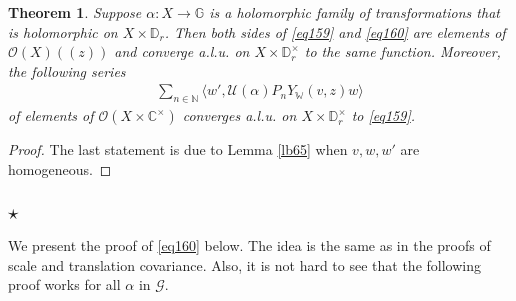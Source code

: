 \documentclass[11pt,b5paper,notitlepage]{article}
\theoremstyle{definition}
\theoremstyle{plain}
\newtheorem{thm}[df]{Theorem}
\newcommand{\mc}{\mathcal}
\newcommand{\bk}[1]{\langle {#1}\rangle}
\newcommand{\scr}{\mathscr}
\newcommand{\Wbb}{\mathbb W}
\newcommand{\Gbb}{\mathbb G}
\newcommand{\Cbb}{\mathbb C}
\newcommand{\Nbb}{\mathbb N}
\newcommand{\Dbb}{\mathbb D}
\numberwithin{equation}{section}
\begin{document}
\begin{thm}\label{lb95}
Suppose $\alpha:X\rightarrow\Gbb$ is a holomorphic family of transformations that is holomorphic on $X\times\Dbb_r$. Then both sides of \eqref{eq159} and \eqref{eq160} are elements of $\scr O(X)((z))$ and converge a.l.u. on $X\times\Dbb_r^\times$ to the same function. Moreover, the following series 
\begin{align}
\sum_{n\in\Nbb}\bk{w',\mc U(\alpha)P_nY_\Wbb(v,z)w}	
\end{align}
of elements of $\scr O(X\times\Cbb^{\times})$ converges a.l.u. on $X\times\Dbb_r^\times$ to \eqref{eq159}.
\end{thm}

\begin{proof}
The last statement is due to Lemma \ref{lb65} when $v,w,w'$ are homogeneous.
\end{proof}





\subsection{$\star$}

We present the proof of \eqref{eq160} below. The idea is the same as in the proofs of scale and translation covariance. Also, it is not hard to see that the following proof works for all $\alpha$ in $\mc G$.
\end{document}
